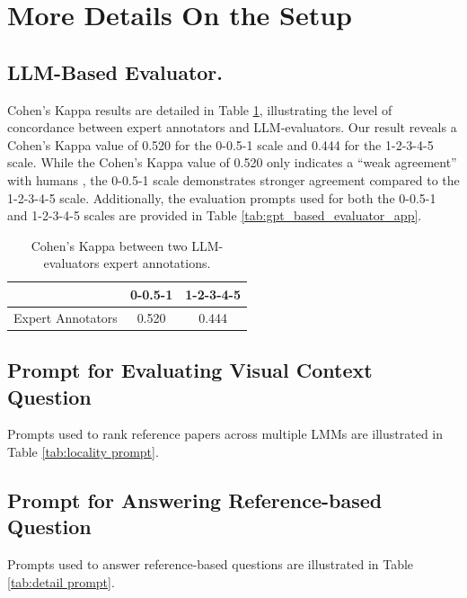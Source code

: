 \section{More Details On the Setup}

\subsection{LLM-Based Evaluator.} 
\label{cohen's kappa}
Cohen’s Kappa results are detailed in Table \ref{tab:cohen's kappa}, illustrating the level of concordance between expert annotators and LLM-evaluators. Our result reveals a Cohen's Kappa value of 0.520 for the 0-0.5-1 scale and 0.444 for the 1-2-3-4-5 scale. While the Cohen's Kappa value of 0.520 only indicates a ``weak agreement'' with humans \cite{cohen's_kappa}, the 0-0.5-1 scale demonstrates stronger agreement compared to the 1-2-3-4-5 scale. Additionally, the evaluation prompts used for both the 0-0.5-1 and 1-2-3-4-5 scales are provided in Table \ref{tab:gpt_based_evaluator_app}. 

\begin{table}[!t]
    \centering
    \small
    \begin{tabular}{ccc}
    \toprule
     & \textbf{0-0.5-1} & \textbf{1-2-3-4-5} \\
    \midrule
    Expert Annotators & 0.520 & 0.444 \\
    \bottomrule
    \end{tabular}
    \caption{Cohen's Kappa between two LLM-evaluators \wrt expert annotations.}
    \label{tab:cohen's kappa}
\end{table}






\subsection{Prompt for Evaluating Visual Context Question}
Prompts used to rank reference papers across multiple LMMs are illustrated in Table \ref{tab:locality prompt}.



\subsection{Prompt for Answering Reference-based Question}
\label{appx:prompt_for_combined_questions}
Prompts used to answer reference-based questions are illustrated in Table \ref{tab:detail prompt}.

